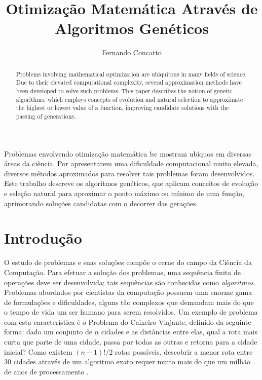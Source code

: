 \documentclass[12pt]{article}
\title{Otimização Matemática Através de Algoritmos Genéticos}
\author{Fernando Concatto\inst{1}}
\begin{document}
\maketitle

\begin{abstract}
  Problems involving mathematical optimization are ubiquitous in many fields of science. Due to their elevated computational complexity, several approximation methods have been developed to solve such problems. This paper describes the notion of genetic algorithms, which employs concepts of evolution and natural selection to approximate the highest or lowest value of a function, improving candidate solutions with the passing of generations.
\end{abstract}

\begin{resumo}
  Problemas envolvendo otimização matemática !se mostram ubíquos em diversas áreas da ciência. Por apresentarem uma dificuldade computacional muito elevada, diversos métodos aproximados para resolver tais problemas foram desenvolvidos. Este trabalho descreve os algoritmos genéticos, que aplicam conceitos de evolução e seleção natural para aproximar o ponto máximo ou mínimo de uma função, aprimorando soluções candidatas com o decorrer das gerações.
\end{resumo}


\section{Introdução} \label{sec:intro}

O estudo de problemas e suas soluções compõe o cerne do campo da Ciência da Computação. Para efetuar a solução dos problemas, uma sequência finita de operações deve ser desenvolvida; tais sequências são conhecidas como \textit{algoritmos}. Problemas abordados por cientistas da computação possuem uma enorme gama de formulações e dificuldades, alguns tão complexos que demandam mais do que o tempo de vida um ser humano para serem resolvidos. Um exemplo de problema com esta característica é o Problema do Caixeiro Viajante, definido da seguinte forma: dado um conjunto de $n$ cidades e as distâncias entre elas, qual a rota mais curta que parte de uma cidade, passa por todas as outras e retorna para a cidade inicial? Como existem $(n-1)!/2$ rotas possíveis, descobrir a menor rota entre 30 cidades através de um algoritmo exato requer muito mais do que um milhão de anos de processamento \cite{MacGregor2011}.
\end{document}
